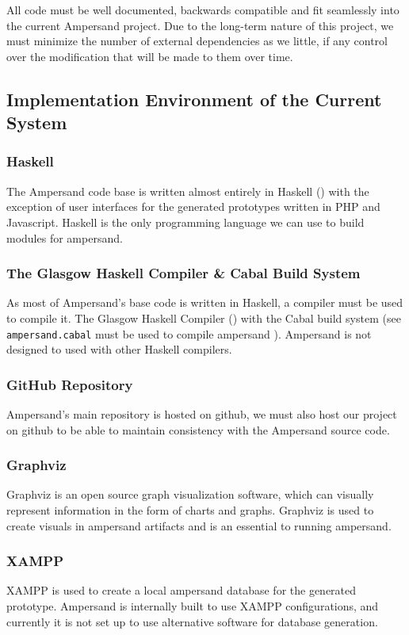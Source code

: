 \documentclass[12pt]{report}
\begin{document}
All code must be well documented, backwards compatible and fit seamlessly into 
the current Ampersand project. Due to the long-term nature of this project, we 
must minimize the number of external dependencies as we little, if any control 
over the modification that will be made to them over time. 

\subsection{Implementation Environment of the Current System}
\subsubsection*{Haskell}
The Ampersand code base is written almost entirely in Haskell 
(\cite{ampSource}) with the exception of user interfaces for the generated 
prototypes written in PHP and Javascript. Haskell is the only programming 
language we can use to build modules for ampersand.


\subsubsection*{The Glasgow Haskell Compiler \& Cabal Build System}
As most of Ampersand's base code is written in Haskell, a compiler must be used 
to compile it. The Glasgow Haskell Compiler (\cite{GHC}) with the Cabal build 
system (see \verb|ampersand.cabal| must be used to compile ampersand 
\cite{ampSource}). Ampersand is not designed to used with other Haskell 
compilers.


\subsubsection*{GitHub Repository}
Ampersand's main repository is hosted on github, we must also host our project 
on github to be able to maintain consistency with the Ampersand source code.

\subsubsection*{Graphviz}
Graphviz is an open source graph visualization software, which can
visually represent information in the form of charts and graphs. Graphviz is 
used to create visuals in ampersand artifacts and is an essential to running 
ampersand.

\subsubsection*{XAMPP}
XAMPP is used to create a local ampersand database for the generated prototype. 
Ampersand is internally built to use XAMPP configurations, and currently it is 
not set up to use alternative software for database generation.
\end{document}
